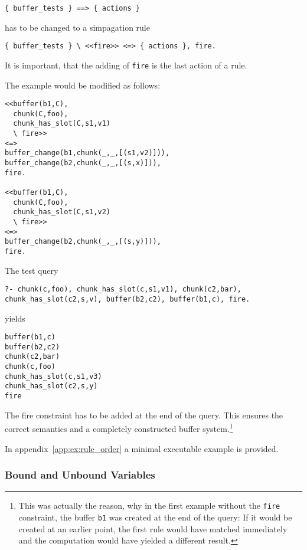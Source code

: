 \begin{lstlisting}
{ buffer_tests } ==> { actions }
\end{lstlisting}

has to be changed to a simpagation rule

\begin{lstlisting}
{ buffer_tests } \ <<fire>> <=> { actions }, fire.
\end{lstlisting}

It is important, that the adding of \verb|fire| is the last action of a rule.

The example would be modified as follows:

\begin{lstlisting}
<<buffer(b1,C),
  chunk(C,foo),
  chunk_has_slot(C,s1,v1)
  \ fire>>
<=>
buffer_change(b1,chunk(_,_,[(s1,v2)])),
buffer_change(b2,chunk(_,_,[(s,x)])),
fire.

<<buffer(b1,C),
  chunk(C,foo),
  chunk_has_slot(C,s1,v2)
  \ fire>>
<=>
buffer_change(b2,chunk(_,_,[(s,y)])),
fire.
\end{lstlisting}


The test query

\begin{lstlisting}
?- chunk(c,foo), chunk_has_slot(c,s1,v1), chunk(c2,bar), chunk_has_slot(c2,s,v), buffer(b2,c2), buffer(b1,c), fire.
\end{lstlisting}

yields

\begin{lstlisting}
buffer(b1,c)
buffer(b2,c2)
chunk(c2,bar)
chunk(c,foo)
chunk_has_slot(c,s1,v3)
chunk_has_slot(c2,s,y)
fire
\end{lstlisting}

The fire constraint has to be added at the end of the query. This ensures the correct semantics and a completely constructed buffer system.\footnote{This was actually the reason, why in the first example without the \texttt{fire} constraint, the buffer \texttt{b1} was created at the end of the query: If it would be created at an earlier point, the first rule would have matched immediately and the computation would have yielded a different result.}

In appendix~\ref{app:ex:rule_order} a minimal executable example is provided.

\subsubsection{Bound and Unbound Variables}
\label{bound_and_unbound_variables}

